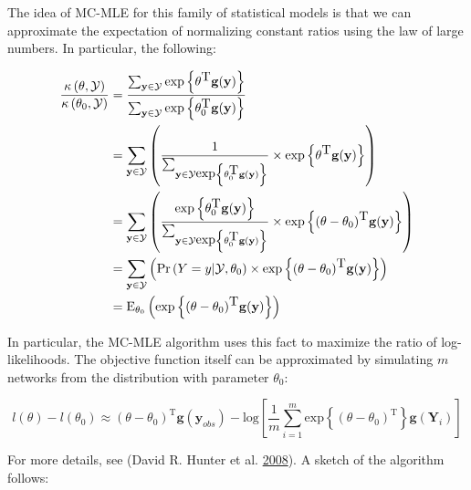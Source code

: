 \documentclass[]{book}
\begin{document}
The idea of MC-MLE for this family of statistical models is that we can approximate the expectation of normalizing constant ratios using the law of large numbers. In particular, the following:

\[
\begin{aligned}
\frac{\kappa\left(\theta,\mathcal{Y}\right)}{\kappa\left(\theta_0,\mathcal{Y}\right)} & = %
  \frac{%
    \sum_{\mathbf{y}\in\mathcal{Y}}\mbox{exp}\left\{\theta^{\mbox{T}}\mathbf{g}(\mathbf{y})\right\}}{ %
    \sum_{\mathbf{y}\in\mathcal{Y}}\mbox{exp}\left\{\theta_0^{\mbox{T}}\mathbf{g}(\mathbf{y})\right\}
  } \\
& = \sum_{\mathbf{y}\in\mathcal{Y}}\left( %
  \frac{1}{%
    \sum_{\mathbf{y}\in\mathcal{Y}\mbox{exp}\left\{\theta_0^{\mbox{T}}\mathbf{g}(\mathbf{y})\right\}}%
  } \times %
  \mbox{exp}\left\{\theta^{\mbox{T}}\mathbf{g}(\mathbf{y})\right\} %
  \right) \\
& = \sum_{\mathbf{y}\in\mathcal{Y}}\left( %
  \frac{\mbox{exp}\left\{\theta_0^{\mbox{T}}\mathbf{g}(\mathbf{y})\right\}}{%
    \sum_{\mathbf{y}\in\mathcal{Y}\mbox{exp}\left\{\theta_0^{\mbox{T}}\mathbf{g}(\mathbf{y})\right\}}%
  } \times %
  \mbox{exp}\left\{(\theta - \theta_0)^{\mbox{T}}\mathbf{g}(\mathbf{y})\right\} %
  \right) \\
& = \sum_{\mathbf{y}\in\mathcal{Y}}\left( %
  \mbox{Pr}\left(Y = y|\mathcal{Y}, \theta_0\right) \times %
  \mbox{exp}\left\{(\theta - \theta_0)^{\mbox{T}}\mathbf{g}(\mathbf{y})\right\} %
  \right) \\
& = \mbox{E}_{\theta_0}\left(\mbox{exp}\left\{(\theta - \theta_0)^{\mbox{T}}\mathbf{g}(\mathbf{y})\right\} \right)
\end{aligned}
\]

In particular, the MC-MLE algorithm uses this fact to maximize the ratio of log-likelihoods. The objective function itself can be approximated by simulating \(m\) networks from the distribution with parameter \(\theta_0\):

\[
l(\theta) - l(\theta_0) \approx (\theta - \theta_0)^{\mbox{T}}\mathbf{g}(\mathbf{y}_{obs}) - 
\mbox{log}{\left[\frac{1}{m}\sum_{i = 1}^m\mbox{exp}\left\{(\theta-\theta_0)^{\mbox{T}}\right\}\mathbf{g}(\mathbf{Y}_i)\right]}
\]

For more details, see (David R. Hunter et al. \protect\hyperlink{ref-Hunter2008}{2008}). A sketch of the algorithm follows:
\end{document}
